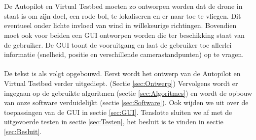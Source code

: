 \\
\\
De Autopilot en Virtual Testbed moeten zo ontworpen worden dat de drone in staat is om zijn doel, een rode bol, te lokaliseren en er naar toe te vliegen. Dit eventueel onder lichte invloed van wind in willekeurige richtingen. Bovendien moet ook voor beiden een GUI ontworpen worden die ter beschikking staat van de gebruiker. De GUI toont de vooruitgang en laat de gebruiker toe allerlei informatie (snelheid, positie en verschillende camerastandpunten) op te vragen.
\\
\\
De tekst is als volgt opgebouwd. Eerst wordt het ontwerp van de Autopilot en Virtual Testbed verder uitgediept. (Sectie \ref{sec:Ontwerp}) Vervolgens wordt er ingegaan op de gebruikte algoritmen (sectie \ref{sec:Algoritmes}) en wordt de opbouw van onze software verduidelijkt (sectie \ref{sec:Software}). Ook wijden we uit over de toepassingen van de GUI in sectie \ref{sec:GUI}. Tenslotte sluiten we af met de uitgevoerde testen in sectie \ref{sec:Testen}, het besluit is te vinden in sectie \ref{sec:Besluit}. \\